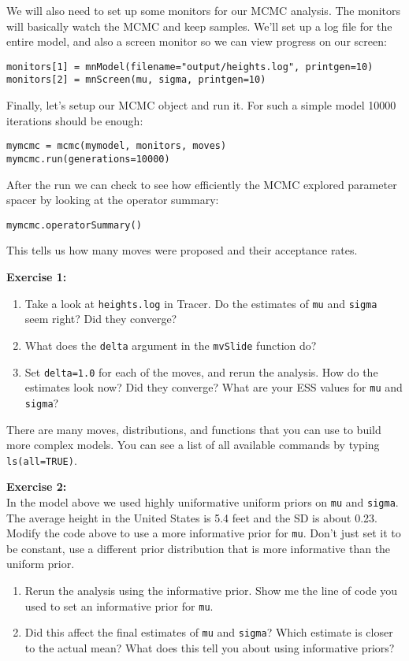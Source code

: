 \documentclass[11pt]{article}
\begin{document}
We will also need to set up some monitors for our MCMC analysis.
The monitors will basically watch the MCMC and keep samples.
We'll set up a log file for the entire model, and also a screen monitor
so we can view progress on our screen:
\begin{verbatim}
monitors[1] = mnModel(filename="output/heights.log", printgen=10)
monitors[2] = mnScreen(mu, sigma, printgen=10)
\end{verbatim}
Finally, let's setup our MCMC object and run it.
For such a simple model 10000 iterations should be enough:
\begin{verbatim}
mymcmc = mcmc(mymodel, monitors, moves)
mymcmc.run(generations=10000)
\end{verbatim}
After the run we can check to see how efficiently the MCMC explored parameter spacer
by looking at the operator summary:
\begin{verbatim}
mymcmc.operatorSummary()
\end{verbatim}
This tells us how many moves were proposed and their acceptance rates.

\begin{framed}
\noindent
\textbf{Exercise 1:} \\
\begin{enumerate}
\item Take a look at \texttt{heights.log} in Tracer.
    Do the estimates of \texttt{mu} and \texttt{sigma} seem right?
    Did they converge?
\item What does the \texttt{delta} argument in the \texttt{mvSlide}
      function do?
\item Set \texttt{delta=1.0} for each of the moves, and rerun the analysis.
      How do the estimates look now? Did they converge? What are your ESS
      values for \texttt{mu} and \texttt{sigma}?
\end{enumerate}
\end{framed}

There are many moves, distributions, and functions that you can use
to build more complex models.
You can see a list of all available commands by typing \texttt{ls(all=TRUE)}.

\begin{framed}
\noindent
\textbf{Exercise 2:} \\
In the model above we used highly uniformative uniform priors on
\texttt{mu} and \texttt{sigma}.
The average height in the United States is 5.4 feet and the SD is about 0.23.
Modify the code above to use a more informative prior
for \texttt{mu}. Don't just set
    it to be constant, use a different prior distribution that is more informative
    than the uniform prior.
\begin{enumerate}
    \item Rerun the analysis using the informative prior.
        Show me the line of code you used to set an informative
        prior for \texttt{mu}.
    \item Did this affect the final estimates of \texttt{mu} and \texttt{sigma}?
     Which estimate is closer to the actual mean?
     What does this tell you about using informative priors?
\end{enumerate}
\end{framed}
\end{document}
